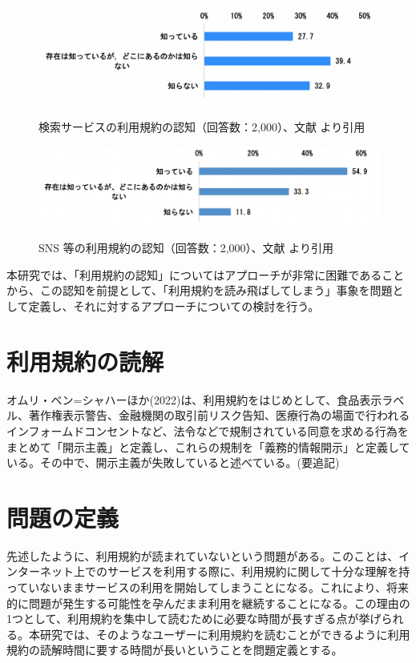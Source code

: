 \begin{figure}[h]
  \begin{center}
      \includegraphics[width=13cm]{img/searchtosninchi.png}
      \caption{検索サービスの利用規約の認知（回答数：2,000）、文献\cite{jftc2021} より引用}
      \label{img:searchtosninchi}
      \includegraphics[width=13cm]{img/snstosninchi.png}
      \caption{SNS 等の利用規約の認知（回答数：2,000）、文献\cite{jftc2021}  より引用}
      \label{img:snstosninchi}
  \end{center}
\end{figure}

本研究では、「利用規約の認知」についてはアプローチが非常に困難であることから、この認知を前提として、「利用規約を読み飛ばしてしまう」事象を問題として定義し、それに対するアプローチについての検討を行う。

\section{利用規約の読解}
オムリ・ベン=シャハーほか(2022)\cite{sonokiyaku2022}は、利用規約をはじめとして、食品表示ラベル、著作権表示警告、金融機関の取引前リスク告知、医療行為の場面で行われるインフォームドコンセントなど、法令などで規制されている同意を求める行為をまとめて「開示主義」と定義し、これらの規制を「義務的情報開示」と定義している。その中で、開示主義が失敗していると述べている。(要追記)

\section{問題の定義}
先述したように、利用規約が読まれていないという問題がある。このことは、インターネット上でのサービスを利用する際に、利用規約に関して十分な理解を持っていないままサービスの利用を開始してしまうことになる。これにより、将来的に問題が発生する可能性を孕んだまま利用を継続することになる。この理由の1つとして、利用規約を集中して読むために必要な時間が長すぎる点が挙げられる。本研究では、そのようなユーザーに利用規約を読むことができるように利用規約の読解時間に要する時間が長いということを問題定義とする。

